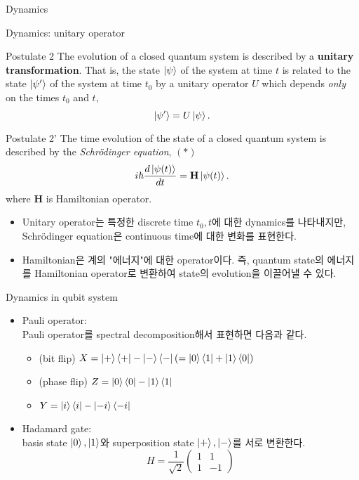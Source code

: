 \documentclass[9pt]{beamer}
\begin{document}
    \begin{section}{Dynamics}
        \begin{frame}{Dynamics: unitary operator}
            \begin{block}{Postulate 2}
                The evolution of a closed quantum system is described by a \textbf{unitary transformation}. That is, the state $\ket \psi$ of the system at time $t$ is related to the state $\ket{\psi '}$ of the system at time $t_0$ by a unitary operator $U$ which depends \textit{only} on the times $t_0$ and $t$,
                $$ \ket {\psi'}  = U \ket \psi.$$
            \end{block}
            \begin{block}{Postulate 2'}
                The time evolution of the state of a closed quantum system is described by the \textit{Schrödinger equation}, $(\ast)$
                $$ i \hbar \frac{d \ket {\psi(t)}}{ dt} = \mathbf{H} \ket{\psi (t)}.$$
                where $\mathbf H$ is Hamiltonian operator.
            \end{block}
            \begin{itemize}
                \item Unitary operator는 특정한 discrete time $t_0, t$에 대한 dynamics를 나타내지만, Schrödinger equation은 continuous time에 대한 변화를 표현한다.
                \item Hamiltonian은 계의 "에너지"에 대한 operator이다. 즉, quantum state의 에너지를 Hamiltonian operator로 변환하여 state의 evolution을 이끌어낼 수 있다.
            \end{itemize}
        \end{frame}
            
        \begin{frame}{Dynamics in qubit system}
            \begin{itemize}
                \item Pauli operator:
                \\Pauli operator를 spectral decomposition해서 표현하면 다음과 같다.
                \begin{itemize}
                    \item (bit flip) $X = \ket + \bra + - \ket - \bra - (=\ket 0 \bra 1 + \ket 1 \bra 0 )$
                    \item (phase flip) $Z = \ket 0 \bra 0 - \ket 1 \bra 1$
                    \item $Y = \ket i \bra i - \ket {-i} \bra {-i}$
                \end{itemize}
                \vspace{0.5cm}
                 \item Hadamard gate:
                \\ basis state $\ket 0, \ket 1$와 superposition state $\ket +, \ket -$를 서로 변환한다.
                $$ H = \frac{1}{\sqrt 2} \begin{pmatrix} 1 & 1 \\ 1 & -1\end{pmatrix}$$
            \end{itemize}
        \end{frame}
    \end{section}
\end{document}

